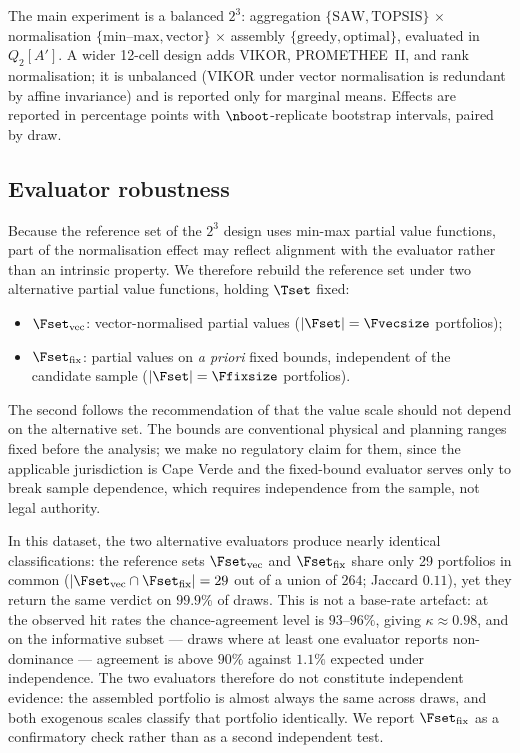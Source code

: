 The main experiment is a balanced $2^3$: aggregation
$\{\text{SAW},\text{TOPSIS}\}$ $\times$ normalisation
$\{\text{min--max},\text{vector}\}$ $\times$ assembly
$\{\text{greedy},\text{optimal}\}$, evaluated in $Q_2[A']$.
A wider 12-cell design adds VIKOR, PROMETHEE~II, and rank normalisation;
it is unbalanced (VIKOR under vector normalisation is redundant by affine
invariance) and is reported only for marginal means.
Effects are reported in percentage points with $\nboot$-replicate
bootstrap intervals, paired by draw.

\subsection{Evaluator robustness}
\label{sec:evaluators}

Because the reference set of the $2^3$ design uses min-max partial value
functions, part of the normalisation effect may reflect alignment with the
evaluator rather than an intrinsic property.
We therefore rebuild the reference set under two alternative partial value
functions, holding $\Tset$ fixed:
\begin{itemize}
  \item $\Fset_{\mathrm{vec}}$: vector-normalised partial values
    ($|\Fset|=\Fvecsize$ portfolios);
  \item $\Fset_{\mathrm{fix}}$: partial values on \emph{a priori} fixed
    bounds, independent of the candidate sample
    ($|\Fset|=\Ffixsize$ portfolios).
\end{itemize}
The second follows the recommendation of \citet{GarciaCascales2012} that
the value scale should not depend on the alternative set.
The bounds are conventional physical and planning ranges fixed before the
analysis; we make no regulatory claim for them, since the applicable
jurisdiction is Cape Verde and the fixed-bound evaluator serves only to
break sample dependence, which requires independence from the sample, not
legal authority.

In this dataset, the two alternative evaluators produce nearly identical
classifications: the reference sets $\Fset_{\mathrm{vec}}$ and
$\Fset_{\mathrm{fix}}$ share only 29 portfolios in common
($|\Fset_{\mathrm{vec}}\cap\Fset_{\mathrm{fix}}|=29$ out of a union of
$264$; Jaccard $0.11$), yet they return the same verdict on
$99.9\%$ of draws.
This is not a base-rate artefact: at the observed hit rates the
chance-agreement level is $93$--$96\%$, giving $\kappa\approx 0.98$,
and on the informative subset --- draws where at least one evaluator
reports non-dominance --- agreement is above $90\%$ against $1.1\%$
expected under independence.
The two evaluators therefore do not constitute independent evidence:
the assembled portfolio is almost always the same across draws, and both
exogenous scales classify that portfolio identically.
We report $\Fset_{\mathrm{fix}}$ as a confirmatory check rather than as
a second independent test.
